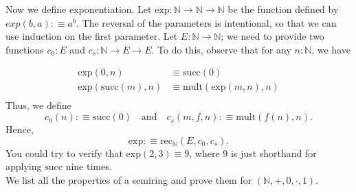 \documentclass[14pt]{extarticle}
\newcommand{\N}{{\mathbb N}}
\newcommand{\0}{{\mathbf 0}}
\newcommand{\1}{{\mathbf 1}}
\newcommand{\2}{{\mathbf 2}}
\newcommand{\rec}{\mathrm{rec}}
\newcommand{\mult}{\mathrm{mult}}
\newcommand{\expp}{\mathrm{exp}}
\newcommand{\su}{\mathrm{succ}}
\begin{document}
Now we define exponentiation. Let $\expp:\N \to \N \to \N$ be the function defined by $exp(b,a) :\equiv a^b$. The reversal of the parameters is intentional, so that we can use induction on the first parameter. Let $E : \N \to \N$; we need to provide two functions $c_0 : E$ and $c_s : \N \to E \to E$. To do this, observe that for any $n :\N$, we have

\begin{align*}
\expp(0,n) &\equiv \su(0) \\
\expp(\su(m),n) &\equiv \mult(\expp(m,n), n) \\
\end{align*}
Thus, we define
\[c_0(n) :\equiv \su(0) \quad \text{and} \quad c_s(m,f,n) :\equiv \mult(f(n),n).\] Hence, \[\expp :\equiv \rec_\N(E,c_0,c_s).\] You could try to verify that $\expp(2,3) \equiv 9$, where $9$ is just shorthand for applying $\su$ nine times.\\

We list all the properties of a semiring and prove them for $(\N, +,0, \cdot,1)$.
\end{document}
